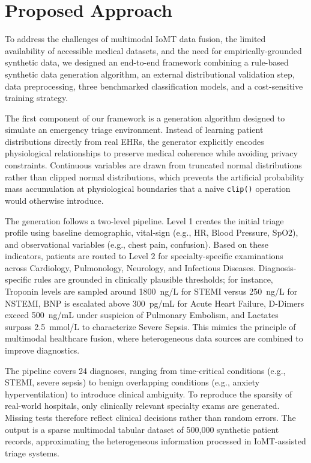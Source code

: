 \section{Proposed Approach}

To address the challenges of multimodal IoMT data fusion, the limited availability of accessible medical datasets, and the need for empirically-grounded synthetic data, we designed an end-to-end framework combining a rule-based synthetic data generation algorithm, an external distributional validation step, data preprocessing, three benchmarked classification models, and a cost-sensitive training strategy.

The first component of our framework is a generation algorithm designed to simulate an emergency triage environment. Instead of learning patient distributions directly from real EHRs, the generator explicitly encodes physiological relationships to preserve medical coherence while avoiding privacy constraints. Continuous variables are drawn from truncated normal distributions rather than clipped normal distributions, which prevents the artificial probability mass accumulation at physiological boundaries that a naive \texttt{clip()} operation would otherwise introduce.

The generation follows a two-level pipeline. Level 1 creates the initial triage profile using baseline demographic, vital-sign (e.g., HR, Blood Pressure, SpO2), and observational variables (e.g., chest pain, confusion). Based on these indicators, patients are routed to Level 2 for specialty-specific examinations across Cardiology, Pulmonology, Neurology, and Infectious Diseases. Diagnosis-specific rules are grounded in clinically plausible thresholds; for instance, Troponin levels are sampled around 1800~ng/L for STEMI versus 250~ng/L for NSTEMI, BNP is escalated above 300~pg/mL for Acute Heart Failure, D-Dimers exceed 500~ng/mL under suspicion of Pulmonary Embolism, and Lactates surpass 2.5~mmol/L to characterize Severe Sepsis. This mimics the principle of multimodal healthcare fusion, where heterogeneous data sources are combined to improve diagnostics.

The pipeline covers 24 diagnoses, ranging from time-critical conditions (e.g., STEMI, severe sepsis) to benign overlapping conditions (e.g., anxiety hyperventilation) to introduce clinical ambiguity. To reproduce the sparsity of real-world hospitals, only clinically relevant specialty exams are generated. Missing tests therefore reflect clinical decisions rather than random errors. The output is a sparse multimodal tabular dataset of 500,000 synthetic patient records, approximating the heterogeneous information processed in IoMT-assisted triage systems.

